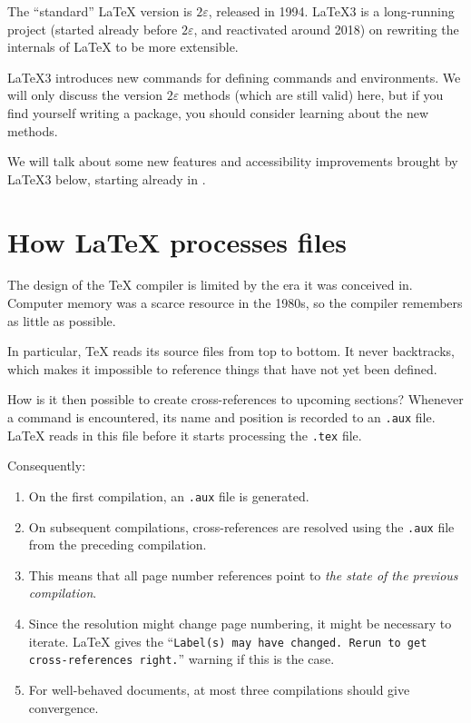 \begin{latexthree}
The ``standard'' \LaTeX{} version is $2\varepsilon$, released in 1994.
\LaTeX3 is a long-running project (started already before $2\varepsilon$, and reactivated around 2018)
on rewriting the internals of \LaTeX{} to be more extensible.

\LaTeX3 introduces new commands for defining commands and environments.
We will only discuss the version $2\varepsilon$ methods (which are still valid) here,
but if you find yourself writing a package, you should consider learning about the new methods.%
\footnotemark

We will talk about some new features and accessibility improvements brought by \LaTeX3 below,
starting already in .
\end{latexthree}



%
%
%
\section{How \LaTeX{} processes files}

The design of the \TeX{} compiler is limited by the era it was conceived in.
Computer memory was a scarce resource in the 1980s,
so the compiler remembers as little as possible.

In particular, \TeX{} reads its source files from top to bottom.
It never backtracks,
which makes it impossible to reference things that have not yet been defined.

How is it then possible to create cross-references to upcoming sections?
Whenever a  command is encountered,
its name and position is recorded to an \verb|.aux| file.
\LaTeX{} reads in this file before it starts processing the \verb|.tex| file.

Consequently:
\begin{enumerate}
\item On the first compilation, an \verb|.aux| file is generated.
\item On subsequent compilations, cross-references are resolved
    using the \verb|.aux| file from the preceding compilation.
\item This means that all page number references point to \emph{the state of the previous compilation}.
\item Since the resolution might change page numbering,
    it might be necessary to iterate.
    \LaTeX{} gives the
    ``\texttt{Label(s) may have changed. Rerun to get cross-references right.}''
    warning if this is the case.
\item For well-behaved documents, at most three compilations should give convergence.
\end{enumerate}

